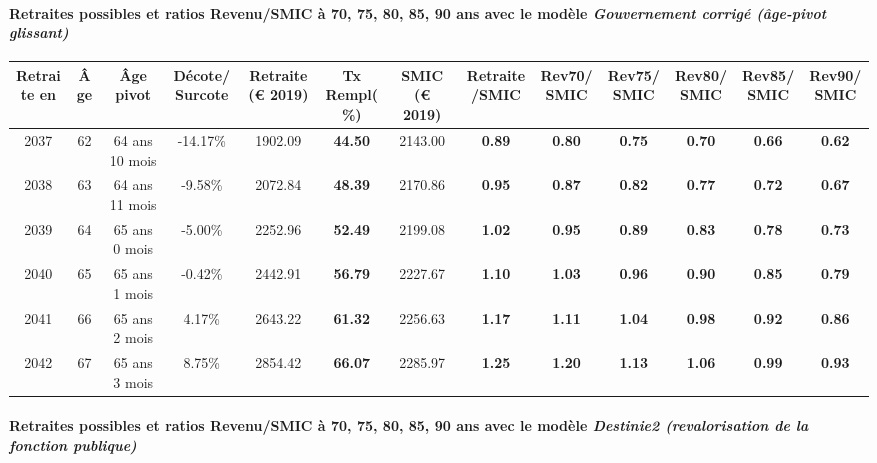 \paragraph{Retraites possibles et ratios Revenu/SMIC à 70, 75, 80, 85, 90 ans avec le modèle \emph{Gouvernement corrigé (âge-pivot glissant)}}  
 
{ \scriptsize \begin{center} 
\begin{tabular}[htb]{|c|c||c|c||c|c||c||c|c|c|c|c|c|} 
\hline 
 Retraite en &  Âge &  Âge pivot &  Décote/Surcote &  Retraite (\euro{} 2019) &  Tx Rempl(\%) &  SMIC (\euro{} 2019) &  Retraite/SMIC &  Rev70/SMIC &  Rev75/SMIC &  Rev80/SMIC &  Rev85/SMIC &  Rev90/SMIC \\ 
\hline \hline 
 2037 &  62 &  64 ans 10 mois &  -14.17\% &  1902.09 &  {\bf 44.50} &  2143.00 &  {\bf {\color{red} 0.89}} &  {\bf {\color{red} 0.80}} &  {\bf {\color{red} 0.75}} &  {\bf {\color{red} 0.70}} &  {\bf {\color{red} 0.66}} &  {\bf {\color{red} 0.62}} \\ 
\hline 
 2038 &  63 &  64 ans 11 mois &  -9.58\% &  2072.84 &  {\bf 48.39} &  2170.86 &  {\bf {\color{red} 0.95}} &  {\bf {\color{red} 0.87}} &  {\bf {\color{red} 0.82}} &  {\bf {\color{red} 0.77}} &  {\bf {\color{red} 0.72}} &  {\bf {\color{red} 0.67}} \\ 
\hline 
 2039 &  64 &  65 ans 0 mois &  -5.00\% &  2252.96 &  {\bf 52.49} &  2199.08 &  {\bf 1.02} &  {\bf {\color{red} 0.95}} &  {\bf {\color{red} 0.89}} &  {\bf {\color{red} 0.83}} &  {\bf {\color{red} 0.78}} &  {\bf {\color{red} 0.73}} \\ 
\hline 
 2040 &  65 &  65 ans 1 mois &  -0.42\% &  2442.91 &  {\bf 56.79} &  2227.67 &  {\bf 1.10} &  {\bf 1.03} &  {\bf {\color{red} 0.96}} &  {\bf {\color{red} 0.90}} &  {\bf {\color{red} 0.85}} &  {\bf {\color{red} 0.79}} \\ 
\hline 
 2041 &  66 &  65 ans 2 mois &  4.17\% &  2643.22 &  {\bf 61.32} &  2256.63 &  {\bf 1.17} &  {\bf 1.11} &  {\bf 1.04} &  {\bf {\color{red} 0.98}} &  {\bf {\color{red} 0.92}} &  {\bf {\color{red} 0.86}} \\ 
\hline 
 2042 &  67 &  65 ans 3 mois &  8.75\% &  2854.42 &  {\bf 66.07} &  2285.97 &  {\bf 1.25} &  {\bf 1.20} &  {\bf 1.13} &  {\bf 1.06} &  {\bf {\color{red} 0.99}} &  {\bf {\color{red} 0.93}} \\ 
\hline 
\hline 
\end{tabular} 
\end{center} } 
\paragraph{Retraites possibles et ratios Revenu/SMIC à 70, 75, 80, 85, 90 ans avec le modèle \emph{Destinie2 (revalorisation de la fonction publique)}}  
 
